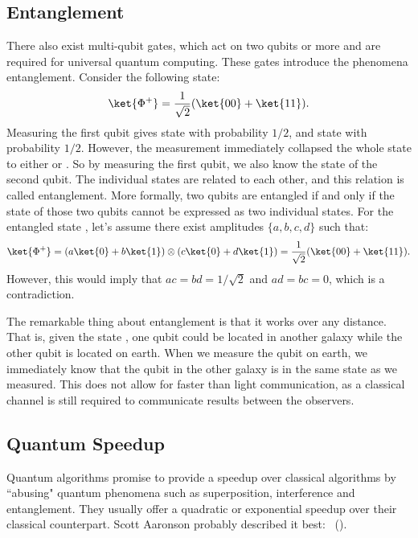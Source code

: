\documentclass[a4paper,10pt]{article}
\begin{document}
\subsection{Entanglement} \label{sec:entanglement}
There also exist multi-qubit gates, which act on two qubits or more and are required for universal quantum computing.
These gates introduce the phenomena entanglement.
Consider the following state:
\begin{equation}
\ket{\Phi^+} = \dfrac{1}{\sqrt2}(\ket{00} + \ket{11}).
\end{equation}
Measuring the first qubit gives state  with probability $1/2$, and state  with probability $1/2$.
However, the measurement immediately collapsed the whole state to either  or .
So by measuring the first qubit, we also know the state of the second qubit.
The individual states are related to each other, and this relation is called entanglement.
More formally, two qubits are entangled if and only if the state of those two qubits cannot be expressed as two individual states.
For the entangled state \ket{\Phi^+}, let's assume there exist amplitudes $\{a, b, c, d\}$ such that:
\begin{equation}
\ket{\Phi^+} = (a\ket{0} + b\ket{1}) \otimes (c\ket{0} + d\ket{1}) = \dfrac{1}{\sqrt2}(\ket{00} + \ket{11}).
\end{equation}
However, this would imply that $ac = bd = 1/\sqrt2$ and $ad = bc = 0$, which is a contradiction.

The remarkable thing about entanglement is that it works over any distance.
That is, given the state \ket{\Phi^+}, one qubit could be located in another galaxy while the other qubit is located on earth.
When we measure the qubit on earth, we immediately know that the qubit in the other galaxy is in the same state as we measured.
This does not allow for faster than light communication, as a classical channel is still required to communicate results between the observers.

\subsection{Quantum Speedup}
Quantum algorithms promise to provide a speedup over classical algorithms by ``abusing" quantum phenomena such as superposition, interference and entanglement.
They usually offer a quadratic or exponential speedup over their classical counterpart.
Scott Aaronson probably described it best:
~(\cite{scott-aaronson-qc}).
\end{document}
